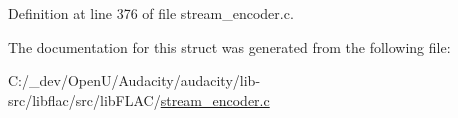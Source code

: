 Definition at line 376 of file stream\+\_\+encoder.\+c.



The documentation for this struct was generated from the following file\+:\begin{DoxyCompactItemize}
\item 
C\+:/\+\_\+dev/\+Open\+U/\+Audacity/audacity/lib-\/src/libflac/src/lib\+F\+L\+A\+C/\hyperlink{stream__encoder_8c}{stream\+\_\+encoder.\+c}\end{DoxyCompactItemize}
